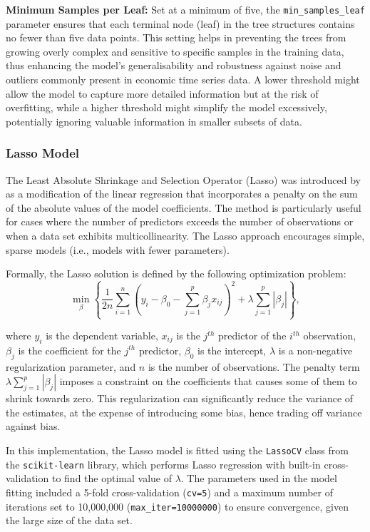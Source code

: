 \noindent \textbf{Minimum Samples per Leaf:} Set at a minimum of five, the \texttt{min\_samples\_leaf} parameter ensures that each terminal node (leaf) in the tree structures contains no fewer than five data points. This setting helps in preventing the trees from growing overly complex and sensitive to specific samples in the training data, thus enhancing the model's generalisability and robustness against noise and outliers commonly present in economic time series data. A lower threshold might allow the model to capture more detailed information but at the risk of overfitting, while a higher threshold might simplify the model excessively, potentially ignoring valuable information in smaller subsets of data.

\subsubsection{Lasso Model}

The Least Absolute Shrinkage and Selection Operator (Lasso) was introduced by \textcite{Tibshirani1996RegressionLasso} as a modification of the linear regression that incorporates a penalty on the sum of the absolute values of the model coefficients. The method is particularly useful for cases where the number of predictors exceeds the number of observations or when a data set exhibits multicollinearity. The Lasso approach encourages simple, sparse models (i.e., models with fewer parameters).

Formally, the Lasso solution is defined by the following optimization problem:
\begin{equation}
    \min_{\beta} \left\{ \frac{1}{2n} \sum_{i=1}^n \left( y_i - \beta_0 - \sum_{j=1}^p \beta_j x_{ij} \right)^2 + \lambda \sum_{j=1}^p |\beta_j| \right\},
\end{equation}

where $y_i$ is the dependent variable, $x_{ij}$ is the $j^{th}$ predictor of the $i^{th}$ observation, $\beta_j$ is the coefficient for the $j^{th}$ predictor, $\beta_0$ is the intercept, $\lambda$ is a non-negative regularization parameter, and $n$ is the number of observations. The penalty term $\lambda \sum_{j=1}^p |\beta_j|$ imposes a constraint on the coefficients that causes some of them to shrink towards zero. This regularization can significantly reduce the variance of the estimates, at the expense of introducing some bias, hence trading off variance against bias.

In this implementation, the Lasso model is fitted using the \texttt{LassoCV} class from the \texttt{scikit-learn} library, which performs Lasso regression with built-in cross-validation to find the optimal value of $\lambda$. The parameters used in the model fitting included a 5-fold cross-validation (\texttt{cv=5}) and a maximum number of iterations set to 10,000,000 (\texttt{max\_iter=10000000}) to ensure convergence, given the large size of the data set.

